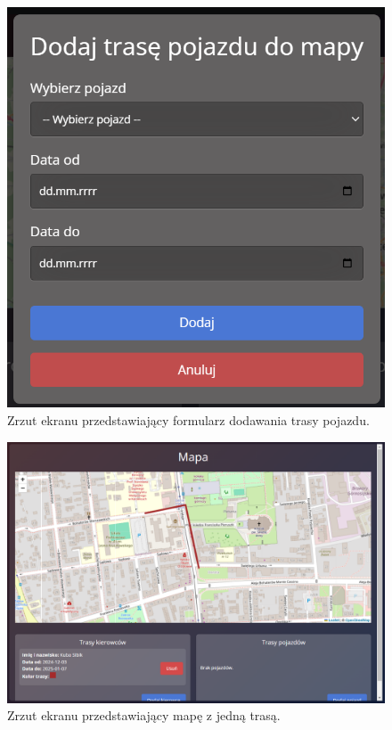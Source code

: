 \begin{figure}
	\centering
	\includegraphics[width=1\textwidth]{./graf/add_vehicle_route.png}
	\caption{Zrzut ekranu przedstawiający formularz dodawania trasy pojazdu.}
	\label{fig:4.16}
\end{figure}

\begin{figure}
	\centering
	\includegraphics[width=1\textwidth]{./graf/map_with_route.png}
	\caption{Zrzut ekranu przedstawiający mapę z jedną trasą.}
	\label{fig:4.17}
\end{figure}



